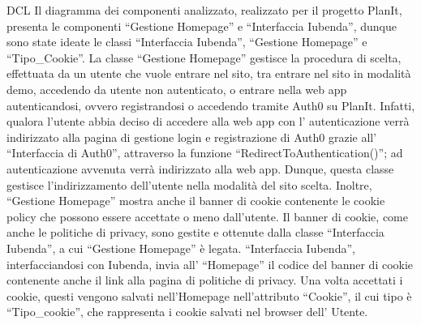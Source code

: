 \begin{listaPersonale}{DCL}
    Il diagramma dei componenti analizzato, realizzato per il progetto PlanIt, presenta le componenti “Gestione Homepage” e “Interfaccia Iubenda”, dunque sono state ideate le classi “Interfaccia Iubenda”, “Gestione Homepage” e “Tipo\_Cookie”.
    La classe “Gestione Homepage” gestisce la procedura di scelta, effettuata da un utente che vuole entrare nel sito, tra entrare nel sito in modalità demo, accedendo da utente non autenticato, o entrare nella web app autenticandosi, ovvero registrandosi o accedendo tramite Auth0 su PlanIt. Infatti, qualora l'utente abbia deciso di accedere alla web app con l' autenticazione verrà indirizzato alla pagina di gestione login e registrazione di Auth0 grazie all' “Interfaccia di Auth0”, attraverso la funzione “RedirectToAuthentication()”; ad autenticazione avvenuta verrà indirizzato alla web app. Dunque, questa classe gestisce l'indirizzamento dell'utente nella modalità del sito scelta. Inoltre, “Gestione Homepage” mostra anche il banner di cookie contenente le cookie policy che possono essere accettate o meno dall'utente. Il banner di cookie, come anche le politiche di privacy, sono gestite e ottenute dalla classe “Interfaccia Iubenda”, a cui “Gestione Homepage” è legata. “Interfaccia Iubenda”, interfacciandosi con Iubenda, invia all' “Homepage” il codice del banner di cookie contenente anche il link alla pagina di politiche di privacy. Una volta accettati i cookie, questi vengono salvati nell'Homepage nell'attributo “Cookie”, il cui tipo è “Tipo\_cookie”, che rappresenta i cookie salvati nel browser dell' Utente.
    \begin{comment}
        \begin{center}
            \\
            \blfootnote{Immagine \href{https://github.com/Life-planner/Documentazione/blob/main/D3/img/Diagrammi/png/path/to/img.png}{PNG}/\href{https://github.com/Life-planner/Documentazione/blob/main/D3/img/Diagrammi/svg/path/to/img.svg}{SVG} nome file}
        \end{center}
    \end{comment}



\end{listaPersonale}

